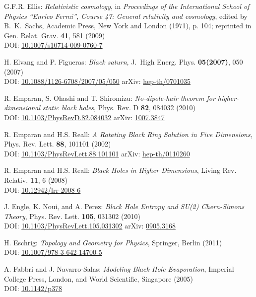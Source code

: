 \begin{thebibliography}{123}
G.F.R. Ellis:
{\em Relativistic cosmology},
in  {\em Proceedings of the International School of Physics ``Enrico Fermi'',
Course 47: General relativity and cosmology}, edited by B.~K.~Sachs,
Academic Press, New York and London (1971), p. 104;
reprinted in Gen. Relat. Grav. {\bf 41}, 581 (2009)\\
DOI: \href{https://doi.org/10.1007/s10714-009-0760-7}{10.1007/s10714-009-0760-7}

H. Elvang and P. Figueras:
{\em Black saturn},
J.~High Energ. Phys. {\bf 05(2007)}, 050 (2007)\\
DOI: \href{https://doi.org/10.1088/1126-6708/2007/05/050}{10.1088/1126-6708/2007/05/050}\hfill
arXiv: \href{https://arxiv.org/abs/hep-th/0701035}{hep-th/0701035}

R. Emparan, S. Ohashi and T. Shiromizu:
{\em No-dipole-hair theorem for higher-dimensional static black holes},
Phys. Rev. D {\bf 82}, 084032 (2010)\\
DOI: \href{https://doi.org/10.1103/PhysRevD.82.084032}{10.1103/PhysRevD.82.084032}\hfill
arXiv: \href{https://arxiv.org/abs/1007.3847}{1007.3847}

R. Emparan and H.S. Reall:
{\em A Rotating Black Ring Solution in Five Dimensions},
Phys. Rev. Lett. {\bf 88}, 101101 (2002)\\
DOI: \href{https://doi.org/10.1103/PhysRevLett.88.101101}{10.1103/PhysRevLett.88.101101}\hfill
arXiv: \href{https://arxiv.org/abs/hep-th/0110260}{hep-th/0110260}

R. Emparan and H.S. Reall:
{\em Black Holes in Higher Dimensions},
Living Rev. Relativ. {\bf 11}, 6 (2008)\\
DOI: \href{https://doi.org/10.12942/lrr-2008-6}{10.12942/lrr-2008-6}

J. Engle, K. Noui, and A. Perez:
{\em Black Hole Entropy and SU(2) Chern-Simons Theory},
Phys. Rev. Lett. {\bf 105}, 031302 (2010)\\
DOI: \href{https://doi.org/10.1103/PhysRevLett.105.031302}{10.1103/PhysRevLett.105.031302}\hfill
arXiv: \href{https://arxiv.org/abs/0905.3168}{0905.3168}

H. Eschrig: {\em Topology and Geometry for Physics},
Springer, Berlin (2011)\\
DOI: \href{https://doi.org/10.1007/978-3-642-14700-5}{10.1007/978-3-642-14700-5}

A. Fabbri and J. Navarro-Salas:
{\em Modeling Black Hole Evaporation},
Imperial College Press, London, and World Scientific, Singapore (2005)\\
DOI: \href{https://doi.org/10.1142/p378}{10.1142/p378}


\end{thebibliography}
